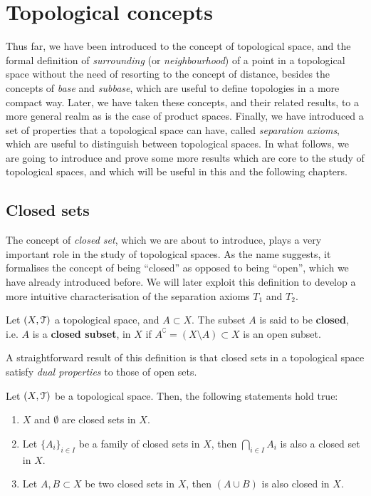 \section{Topological concepts}\label{sec:topological-concepts}

Thus far, we have been introduced to the concept of topological space, and the formal definition of \emph{surrounding} (or \emph{neighbourhood}) of a point in a topological space without the need of resorting to the concept of distance, besides the concepts of \emph{base} and \emph{subbase}, which are useful to define topologies in a more compact way.
Later, we have taken these concepts, and their related results, to a more general realm as is the case of product spaces.
Finally, we have introduced a set of properties that a topological space can have, called \emph{separation axioms}, which are useful to distinguish between topological spaces.
In what follows, we are going to introduce and prove some more results which are core to the study of topological spaces, and which will be useful in this and the following chapters.

\subsection{Closed sets}\label{subsec:closed-sets}

The concept of \emph{closed set}, which we are about to introduce, plays a very important role in the study
of topological spaces.
As the name suggests, it formalises the concept of being ``closed'' as opposed to being ``open'', which we have already introduced before.
We will later exploit this definition to develop a more intuitive characterisation of the separation axioms $T_1$ and $T_2$.

\begin{definition}
	\label{def:closed-set}
	Let $(X,\EuScript{T})$ a topological space, and $A\subset X$.
	The subset $A$ is said to be \textbf{closed}, i.e. $A$ is a \textbf{closed subset}, in $X$ if $A^\complement=(X\setminus A)\subset X$ is an open subset.
\end{definition}

A straightforward result of this definition is that closed sets in a topological space satisfy \emph{dual properties} to those of open sets.

\begin{lemma}
	\label{lem:toplogy-closed-sets}
	Let $(X, \EuScript{T})$ be a topological space. Then, the following statements hold true:
	\begin{enumerate}
		\item $X$ and $\emptyset$ are closed sets in $X$.
		\item Let $\{A_i\}_{i\in I}$ be a family of closed sets in $X$, then $\bigcap_{i\in I} A_i$ is also a closed set in $X$.
		\item Let $A, B\subset X$ be two closed sets in $X$, then $(A\cup B)$ is also closed in $X$.
	\end{enumerate}
\end{lemma}

